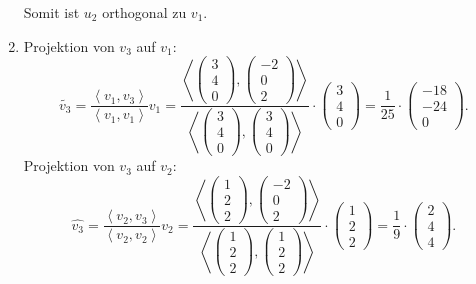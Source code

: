 \documentclass[german,12pt]{homework}
\newcommand{\dotproduct}[2]{\left\langle#1, #2\right\rangle}
\begin{document}
\begin{enumerate}
        Somit ist \(u_2\) orthogonal zu \(v_1\).
        \item Projektion von \(v_3\) auf \(v_1\):
        \[\tilde{v_3} = \frac{\dotproduct{v_1}{v_3}}{\dotproduct{v_1}{v_1}}v_1 = \frac{\dotproduct{\begin{pmatrix}3\\4\\0\end{pmatrix}}{\begin{pmatrix}-2\\0\\2\end{pmatrix}}}{\dotproduct{\begin{pmatrix}3\\4\\0\end{pmatrix}}{\begin{pmatrix}3\\4\\0\end{pmatrix}}} \cdot \begin{pmatrix}3\\4\\0\end{pmatrix} = \frac{1}{25} \cdot \begin{pmatrix}-18\\-24\\0\end{pmatrix}.\]
        Projektion von \(v_3\) auf \(v_2\):
        \[\hat{v_3} = \frac{\dotproduct{v_2}{v_3}}{\dotproduct{v_2}{v_2}}v_2 = \frac{\dotproduct{\begin{pmatrix}1\\2\\2\end{pmatrix}}{\begin{pmatrix}-2\\0\\2\end{pmatrix}}}{\dotproduct{\begin{pmatrix}1\\2\\2\end{pmatrix}}{\begin{pmatrix}1\\2\\2\end{pmatrix}}} \cdot \begin{pmatrix}1\\2\\2\end{pmatrix} = \frac{1}{9} \cdot \begin{pmatrix}2\\4\\4\end{pmatrix}.\]

\end{enumerate}
\end{document}
